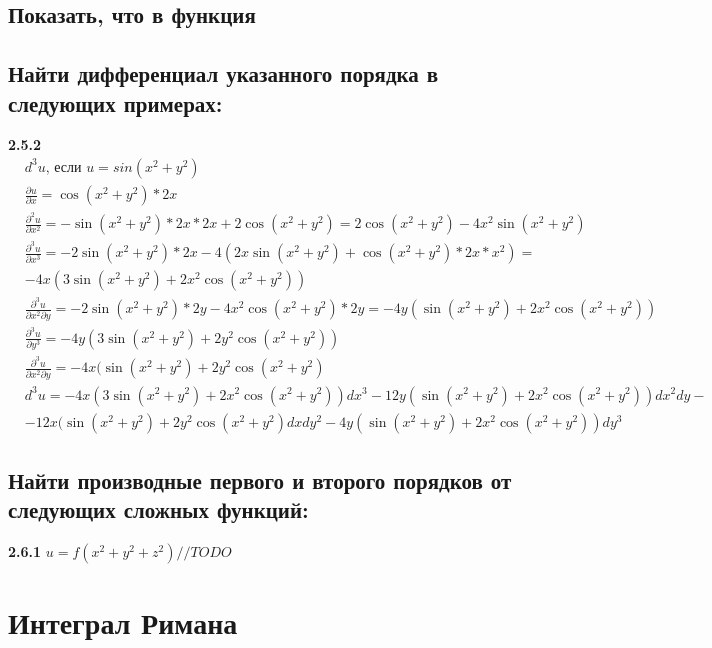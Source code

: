 \documentclass[a4paper, 12pt]{article}
\begin{document}
    \subsection{Показать, что в функция}
    
    \subsection{Найти дифференциал указанного порядка в следующих примерах:}
    
    \textbf{2.5.2}
    \begin{align*}
    &d^3u\text{, если } u = sin(x^2+y^2) \\
    &\frac{\partial u}{\partial x} = \cos{(x^2+y^2)*2x} \\
    &\frac{\partial^2 u}{\partial x^2} = -\sin{(x^2+y^2)}*2x*2x+2\cos{(x^2+y^2)} = 
    2\cos{(x^2+y^2)} - 4x^2\sin{(x^2+y^2)} \\
    &\frac{\partial^3 u}{\partial x^3} = -2\sin{(x^2+y^2)}*2x-4(2x\sin{(x^2+y^2)}+\cos{(x^2+y^2)}*2x*x^2) = \\
    &-4x(3\sin{(x^2+y^2)}+2x^2\cos{(x^2+y^2)}) \\
    &\frac{\partial^3 u}{\partial x^2 \partial y} = 
    -2\sin{(x^2+y^2)}*2y - 4x^2\cos{(x^2+y^2)}*2y = 
    -4y(\sin{(x^2+y^2)}+2x^2\cos{(x^2+y^2)}) \\
    &\frac{\partial^3 u}{\partial y^3} = 
    -4y(3\sin{(x^2+y^2)}+2y^2\cos{(x^2+y^2)}) \\
    &\frac{\partial^3 u}{\partial x^2 \partial y} = -4x(\sin{(x^2+y^2)}+2y^2\cos{(x^2+y^2)} \\ 
    &d^3u = 
    -4x(3\sin{(x^2+y^2)}+2x^2\cos{(x^2+y^2)})dx^3 
    -12y(\sin{(x^2+y^2)}+2x^2\cos{(x^2+y^2)})dx^2dy - \\
    &-12x(\sin{(x^2+y^2)}+2y^2\cos{(x^2+y^2)}dxdy^2
    -4y(\sin{(x^2+y^2)}+2x^2\cos{(x^2+y^2)})dy^3
    \end{align*}
    
    \subsection{Найти производные первого и второго порядков от следующих сложных функций:}
    
    \textbf{2.6.1}
    $u = f(x^2+y^2+z^2) //TODO$
    
    \section{Интеграл Римана}
    
\end{document}
